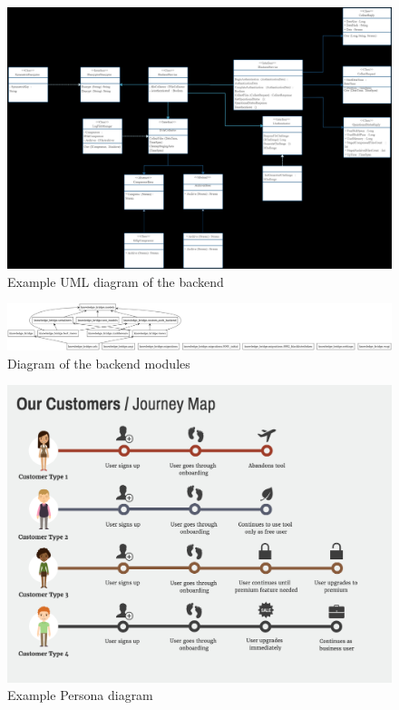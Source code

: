 \documentclass[12pt,a4paper]{article}
\begin{document}
\begin{spacing}{1.5}
    \begin{figure}[H]
        \centering
        \includegraphics[width=1\linewidth]{assets/backend-uml-example.png}
        \caption{Example UML diagram of the backend}
    \end{figure}
    \FloatBarrier

    \begin{figure}[H]
        \centering
        \includegraphics[width=1\linewidth]{assets/KnowledgeBridgePackages.png}
        \caption{Diagram of the backend modules}
    \end{figure}
    \FloatBarrier

    \begin{figure}[H]
        \centering
        \includegraphics[width=1\linewidth]{assets/persona-diagram-example.png}
        \caption{Example Persona diagram}
    \end{figure}
    \FloatBarrier


\end{spacing}
\end{document}
